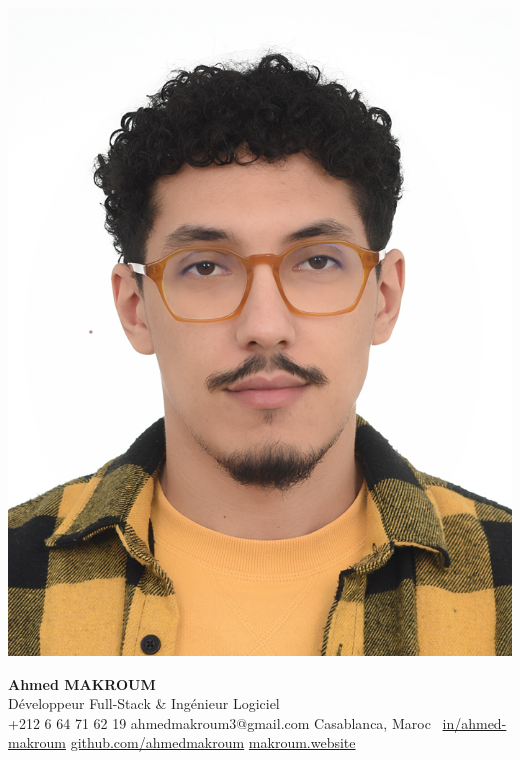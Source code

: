 \documentclass[11pt,a4paper,sans]{moderncv}
\begin{document}
  \hspace*{0.03\textwidth}%
  \begin{minipage}[c]{0.13\textwidth}
    \includegraphics[width=0.85\linewidth]{images/ahmed.jpg}
  \end{minipage}%
  \hfill
  \begin{minipage}[c]{0.84\textwidth}
    \begin{center}
      {\fontsize{20}{22}\selectfont\textbf{Ahmed MAKROUM}}\\[0.7em]
      {\fontsize{13.2}{15.4}\selectfont  Développeur Full-Stack \& Ingénieur Logiciel} \\[0.5em] %
      {\fontsize{10.5}{12.3}\selectfont
        \faMobile\enspace +212 6 64 71 62 19 \quad
        \faEnvelope\enspace ahmedmakroum3@gmail.com \quad
        \faHome\enspace Casablanca, Maroc \
        \faLinkedin\enspace \href{https://www.linkedin.com/in/ahmed-makroum/}{in/ahmed-makroum} \quad
        \faGithub\enspace \href{https://github.com/ahmedmakroum}{github.com/ahmedmakroum}\quad
        \faGlobe\enspace \href{https://makroum.website}{makroum.website}
      }\\[1em]
    \end{center}
  \end{minipage}
  \vspace{-11pt}
\end{document}
